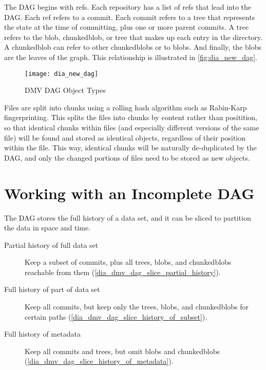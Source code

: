 
The \gls{DAG} begins with \glspl{ref}. Each repository has a list of \glspl{ref}
that lead into the \gls{DAG}. Each \gls{ref} refers to a \gls{commit}. Each
\gls{commit} refers to a \gls{tree} that represents the state at the time of
committing, plus one or more parent \glspl{commit}. A \gls{tree} refers to the
\gls{blob}, \gls{chunkedblob}, or \gls{tree} that makes up each entry in the
directory. A \gls{chunkedblob} can refer to other \glspl{chunkedblob} or to
\glspl{blob}. And finally, the \glspl{blob} are the leaves of the graph. This
relationship is illustrated in \autoref{fig:dia_new_dag}.

\begin{figure}[]
    \centering
        \texttt{[image: dia\_new\_dag]}
    \caption{DMV DAG Object Types}
    \label{fig:dia_new_dag}
\end{figure}


Files are split into chunks using a rolling hash algorithm such as Rabin-Karp
fingerprinting\cite{rabin_karp_fingerprinting}. This splits the files into
chunks by content rather than positition, so that identical chunks within files
(and especially different versions of the same file) will be found and stored as
identical objects, regardless of their position within the file. This way,
identical chunks will be naturally de-duplicated by the \gls{DAG}, and only the
changed portions of files need to be stored as new objects.

%


\section{Working with an Incomplete DAG}

The \gls{DAG} stores the full history of a data set, and it can be sliced to
partition the data in space and time.

\begin{description}

    \item[Partial history of full data set] Keep a subset of \glspl{commit},
        plus all \glspl{tree}, \glspl{blob}, and \glspl{chunkedblob} reachable
        from them (\autoref{dia_dmv_dag_slice_partial_history}).

    \item[Full history of part of data set] Keep all \glspl{commit}, but keep
        only the \glspl{tree}, \glspl{blob}, and \glspl{chunkedblob} for certain
        paths (\autoref{dia_dmv_dag_slice_history_of_subset}).

    \item[Full history of metadata] Keep all \glspl{commit} and \glspl{tree},
        but omit \glspl{blob} and \glspl{chunkedblob}
        (\autoref{dia_dmv_dag_slice_history_of_metadata}).

\end{description}

